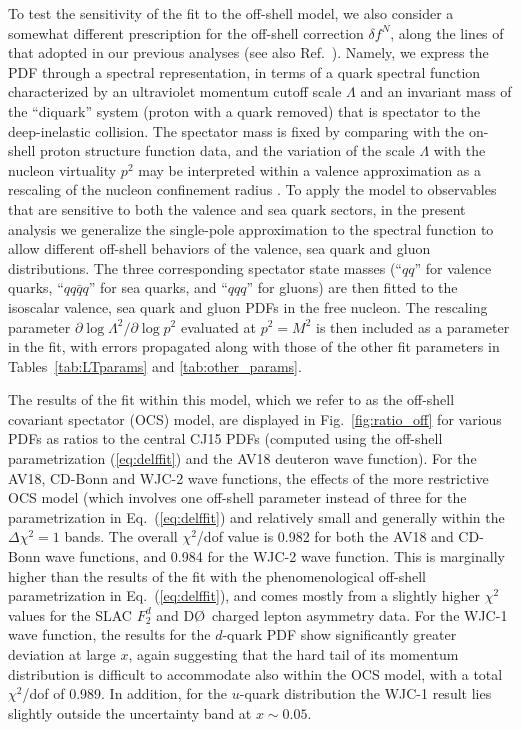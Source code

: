 \documentclass[aps,prd,amsmath,preprint]{revtex4}
\begin{document}
To test the sensitivity of the fit to the off-shell model, we also
consider a somewhat different prescription for the off-shell
correction $\delta f^N$, along the lines of that adopted in our
previous analyses \cite{CJ11, CJ12} (see also Ref.~\cite{KP06}).
Namely, we express the PDF through a spectral representation, in
terms of a quark spectral function characterized by an ultraviolet
momentum cutoff scale $\Lambda$ and an invariant mass of the
``diquark'' system (proton with a quark removed) that is spectator
to the deep-inelastic collision.  The spectator mass is fixed by
comparing with the on-shell proton structure function data, and
the variation of the scale $\Lambda$ with the nucleon virtuality
$p^2$ may be interpreted within a valence approximation as a
rescaling of the nucleon confinement radius \cite{KP06}.
%
To apply the model to observables that are sensitive to both the
valence and sea quark sectors, in the present analysis we generalize
the single-pole approximation to the spectral function to allow
different off-shell behaviors of the valence, sea quark and gluon
distributions.  The three corresponding spectator state masses
(``$qq$'' for valence quarks, ``$qq\bar q q$'' for sea quarks,
and ``$qqq$'' for gluons) are then fitted to the isoscalar
valence, sea quark and gluon PDFs in the free nucleon.
The rescaling parameter $\partial \log\Lambda^2 / \partial \log p^2$
evaluated at $p^2=M^2$ is then included as a parameter in the fit,
with errors propagated along with those of the other fit parameters
in Tables~\ref{tab:LTparams} and \ref{tab:other_params}.


The results of the fit within this model, which we refer to as
the off-shell covariant spectator (OCS) model, are displayed in
Fig.~\ref{fig:ratio_off} for various PDFs as ratios to the
central CJ15 PDFs (computed using the off-shell parametrization
(\ref{eq:delffit}) and the AV18 deuteron wave function).
For the AV18, CD-Bonn and WJC-2 wave functions, the effects of
the more restrictive OCS model (which involves one off-shell
parameter instead of three for the parametrization in
Eq.~(\ref{eq:delffit}) and relatively small and generally
within the $\Delta\chi^2=1$ bands.
The overall $\chi^2$/dof value is 0.982 for both the AV18 and
CD-Bonn wave functions, and 0.984 for the WJC-2 wave function.
This is marginally higher than the results of the fit with the
phenomenological off-shell parametrization in Eq.~(\ref{eq:delffit}),
and comes mostly from a slightly higher $\chi^2$ values for the
SLAC $F_2^d$ and D\O\ charged lepton asymmetry data.
%
For the WJC-1 wave function, the results for the $d$-quark PDF
show significantly greater deviation at large $x$, again
suggesting that the hard tail of its momentum distribution
is difficult to accommodate also within the OCS model,
with a total $\chi^2$/dof of 0.989.
In addition, for the $u$-quark distribution the WJC-1 result
lies slightly outside the uncertainty band at $x \sim 0.05$.
\end{document}
